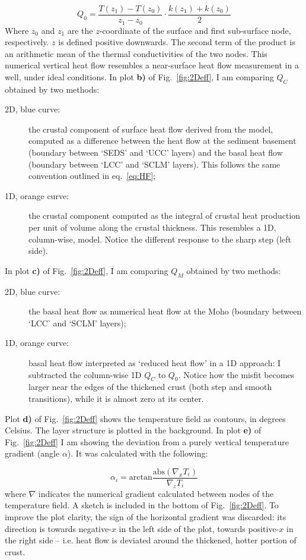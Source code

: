 \begin{subappendices}
\begin{equation}
    Q_0 = \frac{T(z_1) - T(z_0)}{z_1 - z_0} \cdot \frac{k(z_1) + k(z_0)}{2}
\label{eq:HF}
\end{equation}
Where $z_0$ and $z_1$ are the $z$-coordinate of the surface and first sub-surface node, respectively. $z$ is defined positive downwards.
The second term of the product is an arithmetic mean of the thermal conductivities of the two nodes.
This numerical vertical heat flow resembles a near-surface heat flow measurement in a well, under ideal conditions.
In plot \textbf{b)} of Fig.~\ref{fig:2Deff}, I am comparing $Q_C$ obtained by two methods:
\begin{description}
	\item[2D, blue curve:] the crustal component of surface heat flow derived from the model, computed as a difference between the heat flow at the sediment basement (boundary between `SEDS' and `UCC' layers) and the basal heat flow (boundary between `LCC' and `SCLM' layers). This follows the same convention outlined in eq.~\ref{eq:HF};
	\item[1D, orange curve:] the crustal component computed as the integral of crustal heat production per unit of volume along the crustal thickness. This  resembles a 1D, column-wise, model. Notice the different response to the sharp step (left side).
\end{description}
In plot \textbf{c)} of Fig.~\ref{fig:2Deff}, I am comparing $Q_M$ obtained by two methods:
\begin{description}
	\item[2D, blue curve:] the basal heat flow as numerical heat flow at the Moho (boundary between `LCC' and `SCLM' layers);
	\item[1D, orange curve:] basal heat flow interpreted as `reduced heat flow' in a 1D approach: I subtracted the column-wise 1D $Q_C$ to $Q_0$.
	Notice how the misfit becomes larger near the edges of the thickened crust (both step and smooth transitions), while it is almost zero at its center.
\end{description}

Plot \textbf{d)} of Fig.~\ref{fig:2Deff} shows the temperature field as contours, in degrees Celsius.
The layer structure is plotted in the background.
In plot \textbf{e)} of Fig.~\ref{fig:2Deff} I am showing the deviation from a purely vertical temperature gradient (angle $\alpha$).
It was calculated with the following:

\begin{equation}
    \alpha_i = \mathrm{arctan} \frac{\mathrm{abs}\left(\nabla_x T_i \right)}{\nabla_z T_i}
\label{eq:alpha}
\end{equation}
where $\nabla$ indicates the numerical gradient calculated between nodes of the temperature field.
A sketch is included in the bottom of Fig.~\ref{fig:2Deff}.
To improve the plot clarity, the sign of the horizontal gradient was discarded: its direction is towards negative-$x$ in the left side of the plot, towards positive-$x$ in the right side -- i.e. heat flow is deviated around the thickened, hotter portion of crust.


\end{subappendices}
